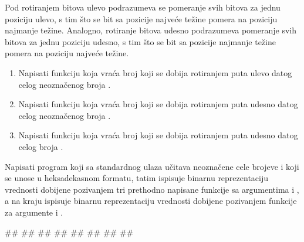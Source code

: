 \begin{Exercise}[label=1_09] %
Pod rotiranjem bitova ulevo podrazumeva se pomeranje svih bitova za jednu poziciju ulevo, s tim što se bit sa pozicije najveće težine pomera na poziciju najmanje težine. Analogno, rotiranje bitova udesno podrazumeva pomeranje svih bitova za jednu poziciju udesno, s tim što se bit sa pozicije najmanje težine pomera na poziciju najveće težine.
\begin{enumerate}
\item Napisati funkciju  koja vraća broj koji se dobija rotiranjem  puta ulevo datog celog neoznačenog broja . 
\item Napisati funkciju  koja vraća broj koji se dobija rotiranjem  puta udesno datog celog neoznačenog broja . 
\item Napisati funkciju  koja vraća broj koji se dobija rotiranjem  puta udesno datog celog broja . 
\end{enumerate}
Napisati program koji sa standardnog ulaza učitava neoznačene cele brojeve  i  koji se unose u heksadekasnom formatu, tatim ispisuje binarnu reprezentaciju vrednosti dobijene pozivanjem tri prethodno napisane funkcije sa argumentima   i , a na kraju ispisuje binarnu reprezentaciju vrednosti dobijene pozivanjem funkcije  za argumente  i .

\begin{maxitest}
\begin{upotreba}{1}
#\naslovInt#
##
##
##
##
##
##
##
\end{upotreba}
\end{maxitest}


\end{Exercise}
